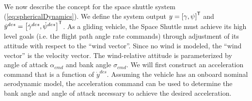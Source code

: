 \documentclass{UnderReview}
\begin{document}
We now describe the concept for the space shuttle system (\ref{eq:sphericalDynamics}).  We define the system output $y=\left[\gamma, \psi\right]^\mathsf{T}$ and $\dot y^{des} = \left[\dot\gamma^{des}, \dot\psi^{des}\right]^\mathsf{T}$.  
\def \fpaDot {\dot y^{des}}
\def \bankCmd {\sigma_{cmd}}
\def \alphaCmd {\alpha_{cmd}}
As a gliding vehicle, the Space Shuttle must achieve its high level goals (i.e. the flight path angle rate commands) through adjustment of its attitude with respect to the ``wind vector''. 
Since no wind is modeled, the ``wind vector'' is the velocity vector. 
The wind-relative attitude is parameterized by angle of attack $ \alphaCmd $ and bank angle $ \bankCmd $.  We will first construct an acceleration command that is a function of $ \fpaDot $. 
Assuming the vehicle has an onboard nominal aerodynamic model, the acceleration command can be used to determine the bank angle and angle of attack necessary to achieve the desired acceleration. 

\def \lat {\phi}
\def \lng {\theta}

\def \vpa {\gamma}
\def \hpa {\psi}

\def \Cev {\dcm[E][V]}
\end{document}

